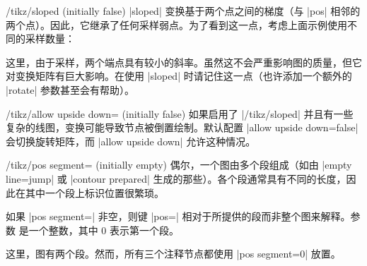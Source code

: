{\begin{key}{/tikz/sloped (initially false)}
    |sloped| 变换基于两个点之间的梯度（与 |pos| 相邻的两个点）。因此，它继承了任何采样弱点。为了看到这一点，考虑上面示例使用不同的采样数量：
\pgfplotsexpensiveexample
\begin{codeexample}[]
\end{codeexample}
    \noindent 这里，由于采样，两个端点具有较小的斜率。虽然这不会严重影响图的质量，但它对变换矩阵有巨大影响。在使用 |sloped| 时请记住这一点（也许添加一个额外的 |rotate| 参数甚至会有帮助）。
\end{key}

\begin{key}{/tikz/allow upside down= (initially false)}
    如果启用了 |/tikz/sloped| 并且有一些复杂的线图，变换可能导致节点被倒置绘制。默认配置 |allow upside down=false| 会切换旋转矩阵，而 |allow upside down| 允许这种情况。
\end{key}

\begin{key}{/tikz/pos segment= (initially empty)}
    偶尔，一个图由多个段组成（如由 |empty line=jump| 或 |contour prepared| 生成的那些）。各个段通常具有不同的长度，因此在其中一个段上标识位置很繁琐。

    如果 |pos segment=| 非空，则键 |pos=| 相对于所提供的段而非整个图来解释。参数  是一个整数，其中 $0$ 表示第一个段。
\begin{codeexample}[]
\end{codeexample}
    这里，图有两个段。然而，所有三个注释节点都使用 |pos segment=0| 放置。


\end{key}}
